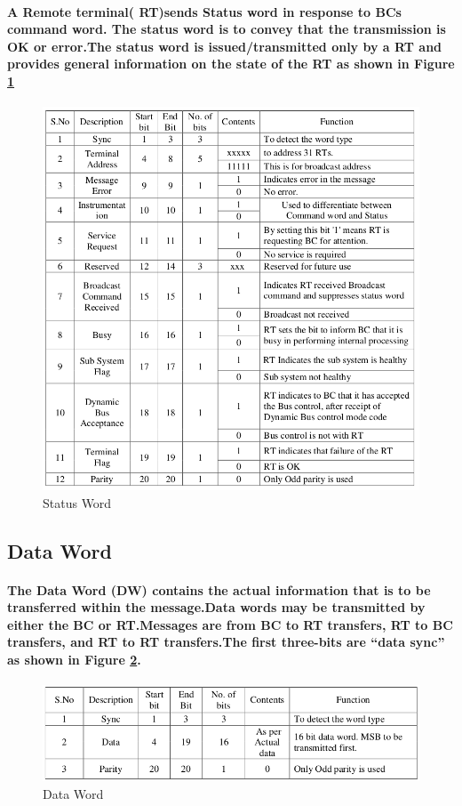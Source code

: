 \documentclass[12pt,a4paper]{report}
\begin{document}
\paragraph{\textrm{\textmd{A Remote terminal( RT)sends Status word in response to BCs command word. The status word is to convey that the transmission is OK or error.The status word is issued/transmitted only by a RT and provides general information on the state of the RT as shown in Figure \ref{fig:sts} }}}
\begin{figure}[h]
	\centering
	\includegraphics[scale=.4]{status.png}
	\caption{Status Word}
	\label{fig:sts}
\end{figure}
\subsection{Data Word}
\paragraph{\textrm{\textmd{ The Data Word (DW) contains the actual information that is to be transferred within the message.Data words may be transmitted by either the BC or RT.Messages are from BC to RT transfers, RT to BC transfers, and RT to RT transfers.The first three-bits are “data sync” as shown in Figure \ref{fig:data}.}}}
\begin{figure}[h]
	\centering
	\includegraphics[scale=.4]{data.png}
	\caption{Data Word}
	\label{fig:data}
\end{figure}
\end{document}
